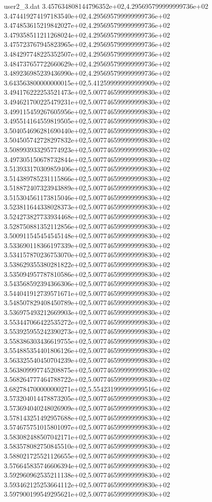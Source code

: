 \begin{filecontents}{user2_3.dat}
3.457634808144796352e+02,4.295695799999999736e+02
3.474419274197183540e+02,4.295695799999999736e+02
3.474853615219842027e+02,4.295695799999999736e+02
3.479358511211268024e+02,4.295695799999999736e+02
3.475723767945823965e+02,4.295695799999999736e+02
3.484297748225352507e+02,4.295695799999999736e+02
3.484737657722660629e+02,4.295695799999999736e+02
3.489236985239436990e+02,4.295695799999999736e+02
3.643563800000000015e+02,5.412599999999999909e+02
3.494176222253521473e+02,5.007746599999999830e+02
3.494621700225479231e+02,5.007746599999999830e+02
3.499115459267605956e+02,5.007746599999999830e+02
3.495514164559819505e+02,5.007746599999999830e+02
3.504054696281690440e+02,5.007746599999999830e+02
3.504505742728297832e+02,5.007746599999999830e+02
3.508993933295774923e+02,5.007746599999999830e+02
3.497305150678732844e+02,5.007746599999999830e+02
3.513933170309859406e+02,5.007746599999999830e+02
3.514389785231115866e+02,5.007746599999999830e+02
3.518872407323943889e+02,5.007746599999999830e+02
3.515304561173815046e+02,5.007746599999999830e+02
3.523811644338028373e+02,5.007746599999999830e+02
3.524273827733934468e+02,5.007746599999999830e+02
3.528750881352112856e+02,5.007746599999999830e+02
3.500911545454545148e+02,5.007746599999999830e+02
3.533690118366197339e+02,5.007746599999999830e+02
3.534157870236753070e+02,5.007746599999999830e+02
3.538629355380281822e+02,5.007746599999999830e+02
3.535094957787810586e+02,5.007746599999999830e+02
3.543568592394366306e+02,5.007746599999999830e+02
3.544041912739571671e+02,5.007746599999999830e+02
3.548507829408450789e+02,5.007746599999999830e+02
3.536975493212669903e+02,5.007746599999999830e+02
3.553447066422535272e+02,5.007746599999999830e+02
3.553925955242390273e+02,5.007746599999999830e+02
3.558386303436619755e+02,5.007746599999999830e+02
3.554885354401806126e+02,5.007746599999999830e+02
3.563325540450704239e+02,5.007746599999999830e+02
3.563809997745208875e+02,5.007746599999999830e+02
3.568264777464788722e+02,5.007746599999999830e+02
3.682784700000000271e+02,5.554231999999999516e+02
3.573204014478873205e+02,5.007746599999999830e+02
3.573694040248026909e+02,5.007746599999999830e+02
3.578143251492957688e+02,5.007746599999999830e+02
3.574675751015801097e+02,5.007746599999999830e+02
3.583082488507042171e+02,5.007746599999999830e+02
3.583578082750845510e+02,5.007746599999999830e+02
3.588021725521126655e+02,5.007746599999999830e+02
3.576645835746606394e+02,5.007746599999999830e+02
3.592960962535211138e+02,5.007746599999999830e+02
3.593462125253664112e+02,5.007746599999999830e+02
3.597900199549295621e+02,5.007746599999999830e+02

\end{filecontents}
